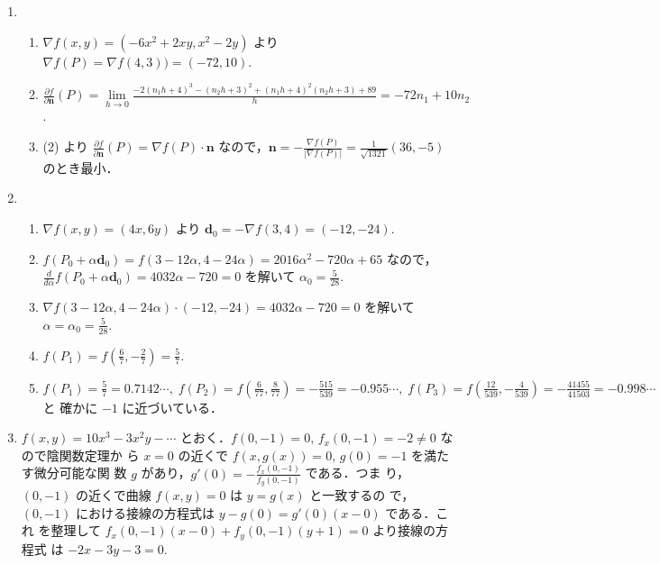 \documentclass[11pt, uplatex, dvipdfmx, twoside]{jsarticle}
\renewcommand{\dlim}{\lim\limits} %
\begin{document}
\begin{enumerate}[label=\ref{sec:partial}.\arabic*]
  \setlength{\itemsep}{1ex}
  
\item
  \begin{enumerate}[label=(\arabic*)]
    \setlength{\itemsep}{1ex}
    
  \item $\nabla f(x,y) = \left( -6x^2+2xy, x^2-2y\right)$ より
    $\nabla f(P) = \nabla f(4,3))=(-72,10)$.

  \item
    $\frac{\partial f}{\partial \bm{n}}(P)= \dlim_{h \to
      0}\frac{-2(n_1 h + 4)^3 - (n_2 h+3)^2 +
      (n_1h+4)^2(n_2h+3)+89}{h} = -72 n_1 + 10 n_2$.

    
  \item (2) より
    $\frac{\partial f}{\partial \bm{n}}(P) = \nabla f(P) \cdot \bm{n}$
    なので，$\bm{n} = -\frac{\nabla f(P)}{ |\nabla f(P)|} =
    \frac{1}{\sqrt{1321}}(36,-5)$ のとき最小．
  \end{enumerate}

\newpage
  
 \item
   \begin{enumerate}[label=(\arabic*)]
     \setlength{\itemsep}{1ex}
     
   \item $\nabla f(x,y) = (4x, 6y)$ より $\bm{d}_0 = -\nabla f(3,4) = (-12, -24)$.

   \item
     $f(P_0 + \alpha \bm{d}_0 )=f(3-12\alpha, 4-24\alpha) =
     2016\alpha^2-720\alpha+65$
     なので，$\frac{d}{d\alpha} f(P_0 + \alpha \bm{d}_0) =
     4032\alpha-720=0$ を解いて $\alpha_0=\frac{5}{28}$.

   \item
     $\nabla f(3-12\alpha, 4-24\alpha) \cdot (-12,-24) =
     4032\alpha-720 =0$ を解いて $\alpha = \alpha_0=\frac{5}{28}$.

   \item $f(P_1) = f\left(\frac{6}{7}, -\frac{2}{7} \right) = \frac{5}{7}$.

   \item
     $ f(P_1) = \frac{5}{7}=0.7142\cdots , \;  f(P_2) = f\left( \frac{6}{77}, \frac{8}{77}\right) =
     -\frac{515}{539}=-0.955\cdots, \; f(P_3) = f\left(\frac{12}{539},
       -\frac{4}{539}\right) = -\frac{41455}{41503} = -0.998\cdots$ と
     確かに $-1$ に近づいている．
   \end{enumerate}

 \item $f(x,y) = 10x^3-3x^2y-\cdots$
   とおく．$f(0,-1) = 0, \, f_x(0,-1) = -2 \neq 0$ なので陰関数定理か
   ら $x=0$ の近くで $f(x, g(x))=0,\, g(0)=-1$ を満たす微分可能な関
   数 $g$ があり，$g'(0) = -\frac{f_x(0,-1)}{f_y(0,-1)}$ である．つま
   り，$(0,-1)$ の近くで曲線 $f(x,y)=0$ は $y=g(x)$ と一致するの
   で，$(0,-1)$ における接線の方程式は $y-g(0)=g'(0)(x-0)$ である．これ
   を整理して $f_x(0,-1)(x-0) + f_y(0,-1)(y+1) =0$ より接線の方程式
   は $-2x-3y-3=0$.

 \end{enumerate}
\end{document}
